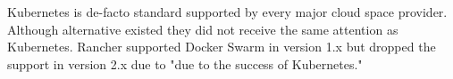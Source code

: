 
Kubernetes is de-facto standard supported by every major cloud space provider. Although alternative existed they did not receive the same attention as Kubernetes. Rancher supported Docker Swarm in version 1.x but dropped the support in version 2.x due to "due to the success of Kubernetes."
